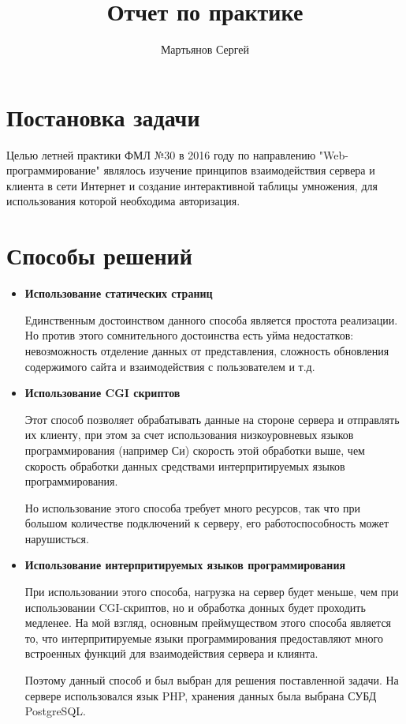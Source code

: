 \documentclass[a4paper]{article}
\author{Мартьянов Сергей}
\title{Отчет по практике}
\begin{document}
\maketitle

\section{Постановка задачи}
Целью летней практики ФМЛ №30 в 2016 году по направлению "Web-программирование" являлось изучение принципов взаимодействия сервера и клиента в сети Интернет и создание интерактивной таблицы умножения, для использования которой необходима авторизация.

\section{Способы решений}
\begin{itemize}
\item \textbf{Использование статических страниц}

Единственным достоинством данного способа является простота реализации. Но против этого сомнительного достоинства есть уйма недостатков: невозможность отделение данных от представления, сложность обновления содержимого сайта и взаимодействия с пользователем и т.д.
\item \textbf{Использование CGI скриптов}

Этот способ позволяет обрабатывать данные на стороне сервера и отправлять их клиенту, при этом за счет использования низкоуровневых языков программирования (например Си) скорость этой обработки выше, чем скорость обработки данных средствами интерпритируемых языков программирования.

Но использование этого способа требует много ресурсов, так что при большом количестве подключений к серверу, его работоспособность может нарушисться.
\item \textbf{Использование интерпритируемых языков программирования}

При использовании этого способа, нагрузка на сервер будет меньше, чем при использовании CGI-скриптов, но и обработка донных будет проходить медленее. На мой взгляд, основным преймуществом этого способа является то, что интерпритируемые языки программирования предоставляют много встроенных функций для взаимодействия сервера и клиянта.

Поэтому данный способ и был выбран для решения поставленной задачи. На сервере использовался язык PHP, хранения данных была выбрана СУБД PostgreSQL.
\end{itemize}
\end{document}
